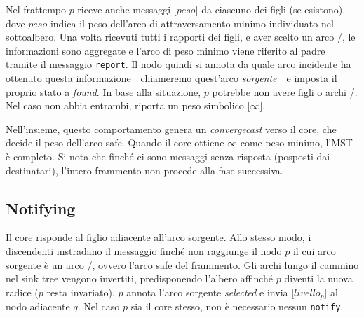 \documentclass[target=bach,aauheader=,style=]{thud}
\newcommand{\eng}[1]{\foreignlanguage{english}{#1}}
\begin{document}
Nel frattempo $p$ riceve anche messaggi [$peso$] da ciascuno dei figli (se esistono), dove $peso$ indica il peso dell'arco di attraversamento minimo individuato nel sottoalbero. Una volta ricevuti tutti i rapporti dei figli, e aver scelto un arco \undecided/, le informazioni sono aggregate e l'arco di peso minimo viene riferito al padre tramite il messaggio \lstinline{report}. Il nodo quindi si annota da quale arco incidente ha ottenuto questa informazione  \,\textendash\, chiameremo quest'arco \emph{sorgente} \,\textendash\, e imposta il proprio stato a \emph{\eng{found}}. In base alla situazione, $p$ potrebbe non avere figli o archi \undecided/. Nel caso non abbia entrambi, riporta un peso simbolico [$\infty$].

Nell'insieme, questo comportamento genera un \emph{\eng{convergecast}} verso il core, che decide il peso dell'arco \eng{safe}. Quando il core ottiene $\infty$ come peso minimo, l'MST è completo. Si nota che finché ci sono messaggi  senza risposta (posposti dai destinatari), l'intero frammento non procede alla fase successiva.

\subsection{\eng{Notifying}}
Il core risponde  al figlio adiacente all'arco sorgente. Allo stesso modo, i discendenti instradano il messaggio finché non raggiunge il nodo $p$ il cui arco sorgente è un arco \undecided/, ovvero l'arco \eng{safe} del frammento. Gli archi lungo il cammino nel \eng{sink tree} vengono invertiti, predisponendo l'albero affinché $p$ diventi la nuova radice ($p$ resta invariato). $p$ annota l'arco sorgente \emph{\eng{selected}} e invia [$livello_p$] al nodo adiacente $q$. Nel caso $p$ sia il core stesso, non è necessario nessun \lstinline{notify}.
\end{document}
